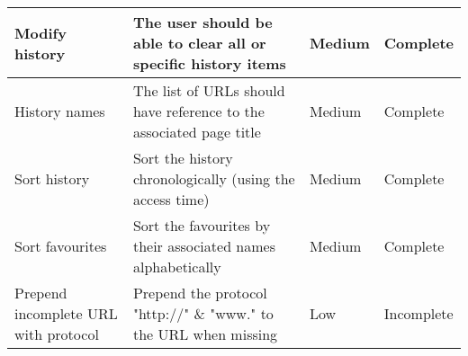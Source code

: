 \documentclass[../Main.tex]{subfiles}
\begin{document}
\begin{center}
\begin{longtable}{|p{3cm}|p{7cm}|l|p{2cm}|}
        Modify history & The user should be able to clear all or specific history items & Medium & Complete\\
        \hline
        History names & The list of URLs should have reference to the associated page title & Medium & Complete \\
        \hline 
        Sort history & Sort the history chronologically (using the access time) & Medium & Complete \\
        \hline
        Sort favourites & Sort the favourites by their associated names alphabetically & Medium & Complete \\
        \hline
        Prepend incomplete URL with protocol & Prepend the protocol "http://" \& "www." to the URL when missing & Low & Incomplete \\
        \hline

    \end{longtable}
\end{center}
\end{document}
